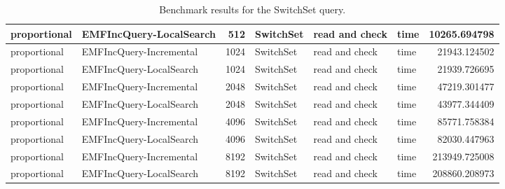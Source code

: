 \begin{table}
\begin{tabular}{| l | l | r | l | l | l | r |}
proportional & EMFIncQuery-LocalSearch & 512 & SwitchSet & read and check & time & 10265.694798\\\hline
proportional & EMFIncQuery-Incremental & 1024 & SwitchSet & read and check & time & 21943.124502\\\hline
proportional & EMFIncQuery-LocalSearch & 1024 & SwitchSet & read and check & time & 21939.726695\\\hline
proportional & EMFIncQuery-Incremental & 2048 & SwitchSet & read and check & time & 47219.301477\\\hline
proportional & EMFIncQuery-LocalSearch & 2048 & SwitchSet & read and check & time & 43977.344409\\\hline
proportional & EMFIncQuery-Incremental & 4096 & SwitchSet & read and check & time & 85771.758384\\\hline
proportional & EMFIncQuery-LocalSearch & 4096 & SwitchSet & read and check & time & 82030.447963\\\hline
proportional & EMFIncQuery-Incremental & 8192 & SwitchSet & read and check & time & 213949.725008\\\hline
proportional & EMFIncQuery-LocalSearch & 8192 & SwitchSet & read and check & time & 208860.208973\\\hline

\end{tabular}\caption{Benchmark results for the \textsf{SwitchSet} query.}
\label{tab:first-validation-switchset}
\end{table}
